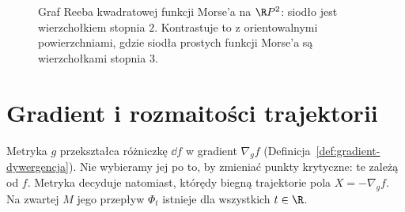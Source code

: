 \begin{figure}[!htbp]
\centering
{}
\caption{Graf Reeba kwadratowej funkcji Morse'a na $\R P^2$:
siodło jest wierzchołkiem stopnia $2$. Kontrastuje
to z orientowalnymi powierzchniami, gdzie siodła
prostych funkcji Morse'a są wierzchołkami stopnia $3$.}
\label{fig:reeb-rp2-siodlo-stopien-dwa-18}
\end{figure}

\section{Gradient i rozmaitości trajektorii}
\label{sec:gradient-morse-17}

Metryka $g$ przekształca różniczkę
$\dd f$ w gradient $\nabla_g f$
(Definicja~\ref{def:gradient-dywergencja}).
Nie wybieramy jej po to, by zmieniać
punkty krytyczne: te zależą od $f$.
Metryka decyduje natomiast, którędy
biegną trajektorie pola
$X=-\nabla_g f$.
Na zwartej $M$ jego przepływ
$\Phi_t$ istnieje dla wszystkich
$t\in\R$.

